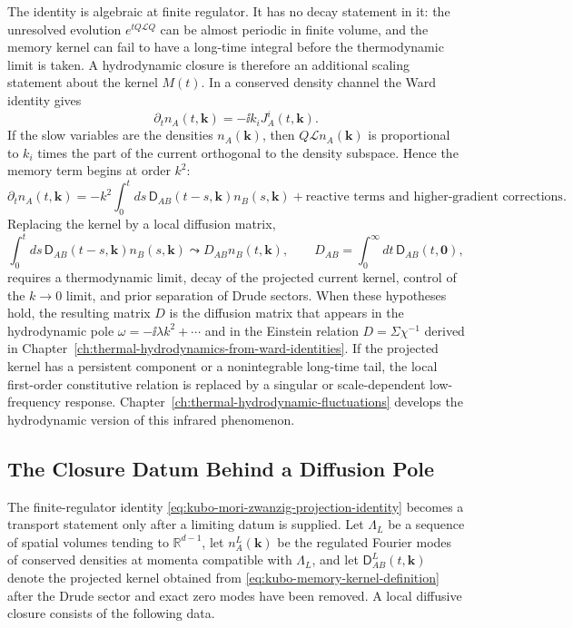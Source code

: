 The identity is algebraic at finite regulator.  It has no decay statement in
it: the unresolved evolution \(e^{tQ\mathcal LQ}\) can be almost periodic in
finite volume, and the memory kernel can fail to have a long-time integral
before the thermodynamic limit is taken.  A hydrodynamic closure is therefore
an additional scaling statement about the kernel \(M(t)\).  In a conserved
density channel the Ward identity gives
\[
  \partial_t n_A(t,\mathbf k)=-\ii k_iJ_A^i(t,\mathbf k).
\]
If the slow variables are the densities \(n_A(\mathbf k)\), then
\(Q\mathcal L n_A(\mathbf k)\) is proportional to \(k_i\) times the part of
the current orthogonal to the density subspace.  Hence the memory term begins
at order \(k^2\):
\begin{equation}
  \partial_t n_A(t,\mathbf k)
  =
  -k^2\int_0^t ds\,
  \mathsf D_{AB}(t-s,\mathbf k)n_B(s,\mathbf k)
  +\text{reactive terms and higher-gradient corrections}.
  \label{eq:kubo-memory-diffusion-form}
\end{equation}
Replacing the kernel by a local diffusion matrix,
\[
  \int_0^t ds\,\mathsf D_{AB}(t-s,\mathbf k)n_B(s,\mathbf k)
  \leadsto
  D_{AB}n_B(t,\mathbf k),
  \qquad
  D_{AB}=\int_0^\infty dt\,\mathsf D_{AB}(t,\mathbf0),
\]
requires a thermodynamic limit, decay of the projected current kernel,
control of the \(k\to0\) limit, and prior separation of Drude sectors.  When
these hypotheses hold, the resulting matrix \(D\) is the diffusion matrix
that appears in the hydrodynamic pole
\(\omega=-\ii\lambda k^2+\cdots\) and in the Einstein relation
\(D=\Sigma\chi^{-1}\) derived in
Chapter~\ref{ch:thermal-hydrodynamics-from-ward-identities}.  If the
projected kernel has a persistent component or a nonintegrable long-time
tail, the local first-order constitutive relation is replaced by a singular
or scale-dependent low-frequency response.
Chapter~\ref{ch:thermal-hydrodynamic-fluctuations} develops the
hydrodynamic version of this infrared phenomenon.

\subsection{The Closure Datum Behind a Diffusion Pole}

The finite-regulator identity
\eqref{eq:kubo-mori-zwanzig-projection-identity} becomes a transport
statement only after a limiting datum is supplied.  Let
\(\Lambda_L\) be a sequence of spatial volumes tending to
\(\mathbb R^{d-1}\), let \(n_A^L(\mathbf k)\) be the regulated Fourier modes
of conserved densities at momenta compatible with \(\Lambda_L\), and let
\(\mathsf D^L_{AB}(t,\mathbf k)\) denote the projected kernel obtained from
\eqref{eq:kubo-memory-kernel-definition} after the Drude sector and exact
zero modes have been removed.  A local diffusive closure consists of the
following data.


